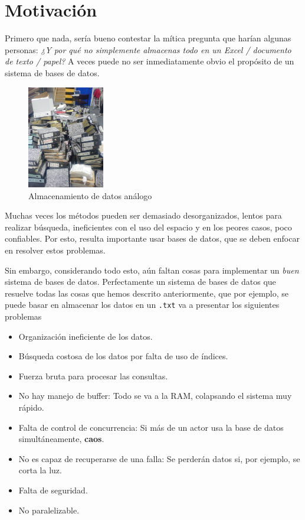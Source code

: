 
\section{Motivación}
Primero que nada, sería bueno contestar la mítica pregunta que harían algunas personas: \textit{¿Y por qué no simplemente almacenas todo en un Excel / documento de texto / papel?} A veces puede no ser inmediatamente obvio el propósito de un sistema de bases de datos.

\begin{figure}[h]
  \centering
  \includegraphics[width=0.3\textwidth]{img/foldermess.png}
  \caption{Almacenamiento de datos análogo}
\end{figure}

Muchas veces los métodos pueden ser demasiado desorganizados, lentos para realizar búsqueda, ineficientes con el uso del espacio y en los peores casos, poco confiables. Por esto, resulta importante usar bases de datos, que se deben enfocar en resolver estos problemas.

Sin embargo, considerando todo esto, aún faltan cosas para implementar un \textit{buen} sistema de bases de datos. Perfectamente un sistema de bases de datos que resuelve todas las cosas que hemos descrito anteriormente, que por ejemplo, se puede basar en almacenar los datos en un \texttt{.txt} va a presentar los siguientes problemas
\begin{itemize}
  \item Organización ineficiente de los datos.
  \item Búsqueda costosa de los datos por falta de uso de índices.
  \item Fuerza bruta para procesar las consultas.
  \item No hay manejo de buffer: Todo se va a la RAM, colapsando el sistema muy rápido.
  \item Falta de control de concurrencia: Si más de un actor usa la base de datos simultáneamente, \textbf{caos}.
  \item No es capaz de recuperarse de una falla: Se perderán datos si, por ejemplo, se corta la luz.
  \item Falta de seguridad.
  \item No paralelizable.
\end{itemize}

